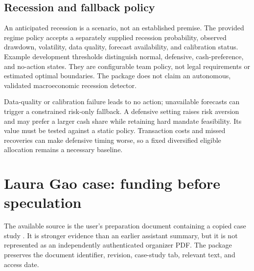 \documentclass[11pt,a4paper]{article}
\begin{document}
\subsection{Recession and fallback policy}

An anticipated recession is a scenario, not an established premise. The provided regime policy accepts a separately supplied recession probability, observed drawdown, volatility, data quality, forecast availability, and calibration status. Example development thresholds distinguish normal, defensive, cash-preference, and no-action states. They are configurable team policy, not legal requirements or estimated optimal boundaries. The package does not claim an autonomous, validated macroeconomic recession detector.

Data-quality or calibration failure leads to no action; unavailable forecasts can trigger a constrained risk-only fallback. A defensive setting raises risk aversion and may prefer a larger cash share while retaining hard mandate feasibility. Its value must be tested against a static policy. Transaction costs and missed recoveries can make defensive timing worse, so a fixed diversified eligible allocation remains a necessary baseline.

\section{Laura Gao case: funding before speculation}

The available source is the user's preparation document containing a copied case study \citep{laura2026}. It is stronger evidence than an earlier assistant summary, but it is not represented as an independently authenticated organizer PDF. The package preserves the document identifier, revision, case-study tab, relevant text, and access date.
\end{document}
